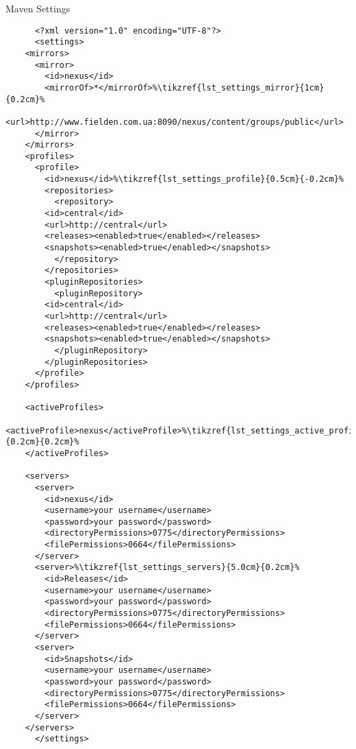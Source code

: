   \begin{code}{Maven Settings}{\label{lst:settings}}
    \begin{lstlisting}
      <?xml version="1.0" encoding="UTF-8"?>
      <settings>
	<mirrors>
	  <mirror>
	    <id>nexus</id>
	    <mirrorOf>*</mirrorOf>%\tikzref{lst_settings_mirror}{1cm}{0.2cm}%
	    <url>http://www.fielden.com.ua:8090/nexus/content/groups/public</url>
	  </mirror>
	</mirrors>
	<profiles>
	  <profile>
	    <id>nexus</id>%\tikzref{lst_settings_profile}{0.5cm}{-0.2cm}%
	    <repositories>
	      <repository>
		<id>central</id>
		<url>http://central</url>
		<releases><enabled>true</enabled></releases>
		<snapshots><enabled>true</enabled></snapshots>
	      </repository>
	    </repositories>
	    <pluginRepositories>
	      <pluginRepository>
		<id>central</id>
		<url>http://central</url>
		<releases><enabled>true</enabled></releases>
		<snapshots><enabled>true</enabled></snapshots>
	      </pluginRepository>
	    </pluginRepositories>
	  </profile>
	</profiles>

	<activeProfiles>
	  <activeProfile>nexus</activeProfile>%\tikzref{lst_settings_active_profile}{0.2cm}{0.2cm}%
	</activeProfiles>

	<servers>
	  <server>
	    <id>nexus</id>
	    <username>your username</username>
	    <password>your password</password>
	    <directoryPermissions>0775</directoryPermissions>
	    <filePermissions>0664</filePermissions>
	  </server>
	  <server>%\tikzref{lst_settings_servers}{5.0cm}{0.2cm}%
	    <id>Releases</id>
	    <username>your username</username>
	    <password>your password</password>
	    <directoryPermissions>0775</directoryPermissions>
	    <filePermissions>0664</filePermissions>
	  </server>
	  <server>
	    <id>Snapshots</id>
	    <username>your username</username>
	    <password>your password</password>
	    <directoryPermissions>0775</directoryPermissions>
	    <filePermissions>0664</filePermissions>
	  </server>
	</servers>
      </settings>
    \end{lstlisting}


\end{code}
